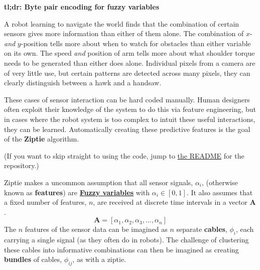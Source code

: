\label{sec:intro}

\textbf{tl;dr: Byte pair encoding for fuzzy variables}

A robot learning to navigate the world finds that the
combination of
certain sensors gives more information than either of them alone.
The combination of $x$- \textit{and} $y$-position tells more about
when to watch for obstacles than either variable on its own.
The speed \textit{and} position of arm tells more about what shoulder
torque needs to be generated than either does alone.
Individual pixels from a camera are of very little use, but certain patterns
are detected across many pixels, they can clearly distinguish
between a hawk and a handsaw.

These cases
of sensor interaction can be hard coded manually. Human designers
often exploit their knowledge of the system to do this
via feature engineering,
but in cases where the robot system is too complex
to intuit these useful interactions, they can be learned.
Automatically creating these predictive features is the goal of 
the \textbf{Ziptie} algorithm.

(If you want to skip straight to using the code, jump to
\href{https://codeberg.org/brohrer/ziptie/src/branch/main/README.md}{the README}
for the repository.)

Ziptie makes a uncommon assumption that all sensor signals,
$\alpha_i$, (otherwise known as \textbf{features}) are
\textbf{\hyperref[sec:fuzzy]{Fuzzy variables}} with
$\alpha_i \in [0, 1]$. It also assumes that
a fixed number of features, $n$, are
received at discrete time intervals in a vector $\mathbf{A}$.
\begin{equation}
\mathbf{A} = [\alpha_1, \alpha_2, \alpha_3, ..., \alpha_n]
\end{equation}
The $n$ features of the sensor data
can be imagined as $n$ separate 
\textbf{cables}, $\phi_i$, each carrying a single signal
(as they often do in robots). The
challenge of clustering these cables into informative combinations
can then be imagined as creating \textbf{bundles} of cables, $\phi_{ij}$,
as with a ziptie.

